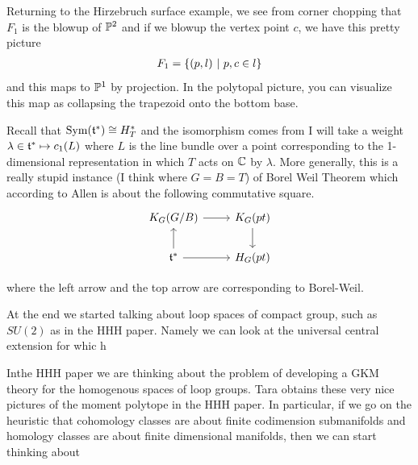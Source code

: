 \documentclass[12pt]{article}
\begin{document}
\begin{example}
    Returning to the Hirzebruch surface example, we see from corner chopping that $F_1$ is the blowup of $\P^2$ and if we blowup the vertex point $c$, we have this pretty picture \begin{align*}
        F_1 = \set{(p,l) \st p,c\in l} 
    \end{align*} and this maps to $\P^1$ by projection. In the polytopal picture, you can visualize this map as collapsing the trapezoid onto the bottom base.
\end{example}

\begin{example}
    Recall that $\Sym(\mf t^*) \cong H_T^*$ and the isomorphism comes from I will take a weight $\lambda \in \mf t^* \mapsto c_1(L)$ where $L$ is the line bundle over a point corresponding to the 1-dimensional representation in which $T$ acts on $\C$ by $\lambda$. More generally, this is a really stupid instance (I think where $G = B = T$) of Borel Weil Theorem which according to Allen is about the following commutative square. %
\[\begin{tikzcd}
	{K_G(G/B)} & {K_G(pt)} \\
	{\mathfrak{t}^*} & {H_G(pt)}
	\arrow[from=1-1, to=1-2]
	\arrow[from=1-2, to=2-2]
	\arrow[from=2-1, to=2-2]
	\arrow[from=2-1, to=1-1]
\end{tikzcd}\] 
\end{example} where the left arrow and the top arrow are corresponding to Borel-Weil.

\begin{example}
    At the end we started talking about loop spaces of compact group, such as $SU(2)$ as in the HHH paper.  Namely we can look at the universal central extension for whic h

    \hfill

    Inthe HHH paper we are thinking about the problem of developing a GKM theory for the homogenous spaces of loop groups. Tara obtains these very nice pictures of the moment polytope in the HHH paper. In particular, if we go on the heuristic that cohomology classes are about finite codimension submanifolds and homology classes are about finite dimensional manifolds, then we can start thinking about 
\end{example}
\end{document}
